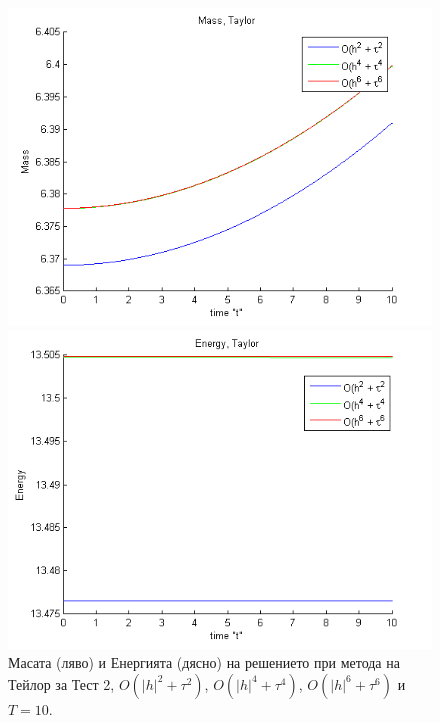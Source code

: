\documentclass{article}
\begin{document}
\begin{figure}[ht]\vspace{0.4cm}
	\begin{minipage}[b]{0.33\linewidth}
		 \includegraphics[width=\linewidth]{../amitans/figures/Mass_bt3_c045_h005_x3O.png}
	\end{minipage}	
	\begin{minipage}[b]{0.33\linewidth}
		\includegraphics[width=\linewidth]{../amitans/figures/Energy_bt1_c090_h010_x3O.png}
		
	\end{minipage}
\caption{Масата (ляво) и Енергията (дясно) на решението при метода на Тейлор за Тест 2, $O(|h|^2 + \tau^2)$, $O(|h|^4 + \tau^4)$, $O(|h|^6 + \tau^6)$ и $T=10$.}
\label{Test2TEn}
\end{figure}
\end{document}
